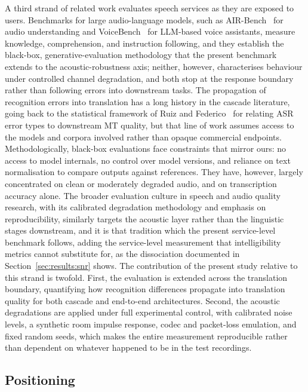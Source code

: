 A third strand of related work evaluates speech services as they are
exposed to users. Benchmarks for large audio-language models, such as
AIR-Bench~\cite{yang2024airbench} for audio understanding and
VoiceBench~\cite{chen2024voicebench} for LLM-based voice assistants,
measure knowledge, comprehension, and instruction following, and they
establish the black-box, generative-evaluation methodology that the present
benchmark extends to the acoustic-robustness axis; neither, however,
characterises behaviour under controlled channel degradation, and both stop
at the response boundary rather than following errors into downstream
tasks. The propagation of recognition errors into translation has a long
history in the cascade literature, going back to the statistical framework
of Ruiz and Federico~\cite{ruiz2014assessing} for relating ASR error types
to downstream MT quality, but that line of work assumes access to the
models and corpora involved rather than opaque commercial endpoints.
Methodologically, black-box evaluations face constraints that mirror ours:
no access to model internals, no control
over model versions, and reliance on text normalisation to compare outputs
against references. They have, however, largely concentrated on clean or
moderately degraded audio, and on transcription accuracy alone. The broader
evaluation culture in speech and audio quality research, with its
calibrated degradation methodology and emphasis on reproducibility,
similarly targets the acoustic layer rather than the linguistic stages
downstream, and it is that tradition which the present service-level
benchmark follows, adding the service-level measurement that
intelligibility metrics cannot substitute for, as the dissociation
documented in Section~\ref{sec:results:snr} shows. The
contribution of the present study relative to this strand is twofold. First,
the evaluation is extended across the translation boundary, quantifying how
recognition differences propagate into translation quality for both cascade
and end-to-end architectures. Second, the acoustic degradations are applied
under full experimental control, with calibrated noise levels, a synthetic
room impulse response, codec and packet-loss emulation, and fixed random
seeds, which makes the entire measurement reproducible rather than dependent
on whatever happened to be in the test recordings.

\subsection{Positioning}

